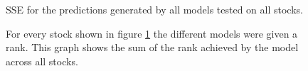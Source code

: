 \begin{figure}[h]
    \centering
    \caption{SSE for the predictions generated by all models tested on all stocks.}
    \label{fig:SSE_all_predictions}
\end{figure}{}

\begin{figure}[h]
    \centering
    \caption{For every stock shown in figure \ref{fig:SSE_all_predictions} the different models were given a rank. This graph shows the sum of the rank achieved by the model across all stocks.}
    \label{fig:SSE_models_ranked}
\end{figure}{}





